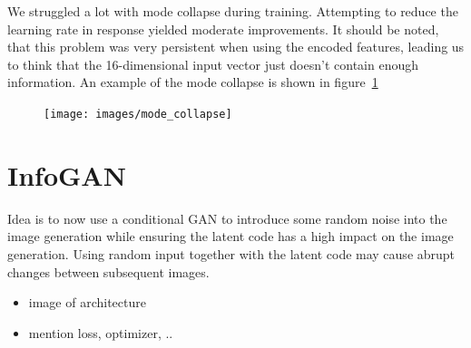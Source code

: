             We struggled a lot with mode collapse during training. Attempting to reduce the learning rate in response yielded moderate improvements. It should be noted, that this problem was very persistent when using the encoded features, leading us to think that the 16-dimensional input vector just doesn't contain enough information. An example of the mode collapse is shown in figure~\ref{fig:mode_collapse}

            \begin{figure}[h]
                \centering
                \texttt{[image: images/mode\_collapse]}
                \caption[]
                {
                    \textbf{}
                }
                \label{fig:mode_collapse}
            \end{figure}

    \section{InfoGAN}

        Idea is to now use a conditional GAN to introduce some random noise into the image generation while ensuring the latent code has a high impact on the image generation. Using random input together with the latent code may cause abrupt changes between subsequent images.
        \begin{itemize}
            \item image of architecture
            \item mention loss, optimizer, ..
        \end{itemize}